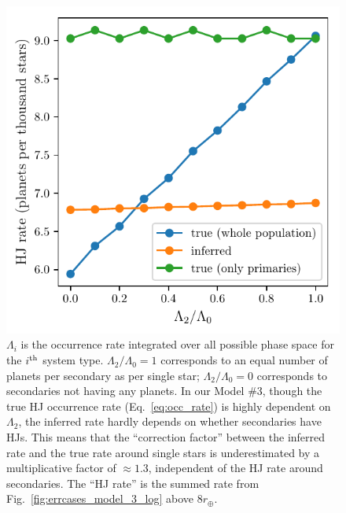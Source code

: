 \begin{figure}[!tb]
    \centering
    \includegraphics[width=.9\textwidth]{figures/HJ_correction_inputrate_vs_HJratevalues.pdf}
    \caption{
    $\Lambda_i$ is the occurrence rate integrated over all possible phase 
    space for the $i^{\rm th}$ system type. $\Lambda_2/\Lambda_0=1$ 
    corresponds to an equal number of planets per secondary as per single star;
    $\Lambda_2/\Lambda_0=0$ corresponds to secondaries not having any planets.
    In our Model \#3, though the true HJ occurrence rate 
    (Eq.~\ref{eq:occ_rate}) is highly dependent on $\Lambda_2$, 
    the inferred rate hardly depends on whether secondaries have HJs.
    This means that the ``correction factor'' between the inferred rate and 
    the true rate around single stars is underestimated by a multiplicative 
    factor of $\approx1.3$, independent of the HJ rate around secondaries.
    The ``HJ rate'' is the summed rate from     
    Fig.~\ref{fig:errcases_model_3_log} above $8r_\oplus$.
    }
    \label{fig:HJ_correction_inputrate_vs_HJratevalues}
\end{figure}

